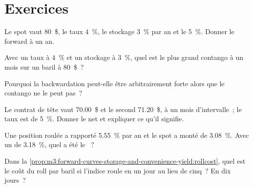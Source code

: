 \section{Exercices}

\begin{exercise}[$\star$]\label{exo:m3:forward-curves-storage-and-convenience-yield:1}
Le spot vaut 80~\$, le taux 4~\%, le stockage 3~\% par an et le  5~\%. Donner le forward
à un an.
\end{exercise}

\begin{exercise}[$\star$]\label{exo:m3:forward-curves-storage-and-convenience-yield:2}
Avec un taux à 4~\% et un stockage à 3~\%, quel est le plus grand contango à un mois sur un baril à 80~\$~?
\end{exercise}

\begin{exercise}[$\star$]\label{exo:m3:forward-curves-storage-and-convenience-yield:3}
Pourquoi la backwardation peut-elle être arbitrairement forte alors que le contango ne le peut pas~?
\end{exercise}

\begin{exercise}[$\star\star$]\label{exo:m3:forward-curves-storage-and-convenience-yield:4}
Le contrat de tête vaut 70.00~\$ et le second 71.20~\$, à un mois d'intervalle~; le taux est de 5~\%. Donner le
 net et expliquer ce qu'il signifie.
\end{exercise}

\begin{exercise}[$\star\star$]\label{exo:m3:forward-curves-storage-and-convenience-yield:5}
Une position roulée a rapporté 5.55~\% par an et le spot a monté de 3.08~\%. Avec un  de 3.18~\%,
quel a été le ~?
\end{exercise}

\begin{exercise}[$\star\star$]\label{exo:m3:forward-curves-storage-and-convenience-yield:6}
Dans la \cref{prop:m3:forward-curves-storage-and-convenience-yield:rollcost}, quel est le coût du roll par baril
si l'indice roule en un jour au lieu de cinq~? En dix jours~?
\end{exercise}

